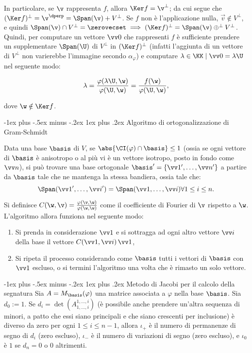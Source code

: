 \documentclass[10pt,landscape]{article}
\makeatletter
\renewcommand{\subsubsection}{\@startsection{subsubsection}{3}{0mm}%
	{-1ex plus -.5ex minus -.2ex}%
	{1ex plus .2ex}%
	{\normalfont\small\bfseries}}
\makeatother
\begin{document}
\begin{multicols}{3}
		In particolare, se $\v$ rappresenta $f$, allora $\Ker f = \v^\perp$; da cui
		segue che $(\Ker f)^\perp = \v^\dperp = \Span(\v) + V^\perp$. Se $f$ non è
		l'applicazione nulla, $\vec v \notin V^\perp$, e quindi $\Span(\v) \cap V^\perp = \zerovecset \implies (\Ker f)^\perp = \Span(\v) \oplus^\perp V^\perp$. Quindi,
		per computare un vettore $\vv 0$ che rappresenti $f$ è sufficiente prendere
		un supplementare $\Span(\U)$ di $V^\perp$ in $(\Ker f)^\perp$ (infatti l'aggiunta
		di un vettore di $V^\perp$ non varierebbe l'immagine secondo $\alpha_\varphi$) e
		computare $\lambda \in \KK \mid \vv 0 = \lambda \U$ nel seguente
		modo:
		
		\[ \lambda = \frac{\varphi(\lambda \U, \w)}{\varphi(\U, \w)} = \frac{f(\w)}{\varphi(\U, \w)}, \]
		
		dove $\w \notin \Ker f$.
		
		\subsubsection{Algoritmo di ortogonalizzazione di Gram-Schmidt}
		
		Data una base $\basis$ di $V$, se $\abs{\CI(\varphi) \cap \basis} \leq 1$ (ossia se ogni vettore di
		$\basis$ è anisotropo o al più vi è un vettore isotropo, posto in fondo come $\vv n$), si può
		trovare una base ortogonale $\basis' = \{ \vv 1', \ldots, \vv n' \}$ a partire da $\basis$ tale che ne mantenga la stessa bandiera, ossia tale che:
		\[ \Span(\vv 1', \ldots, \vv i') = \Span(\vv 1, \ldots, \vv i) \forall 1 \leq i \leq n. \]
		
		Si definisce $C(\w, \v) = \frac{\varphi(\v, \w)}{\varphi(\w, \w)}$ come il coefficiente di Fourier
		di $\v$ rispetto a $\w$. L'algoritmo allora funziona nel seguente modo:
		
		\begin{enumerate}
			\item Si prenda in considerazione $\vv 1$ e si sottragga ad ogni altro vettore $\vv i$ della base il
			vettore $C(\vv 1, \vv i) \, \vv 1$,
			\item Si ripeta il processo considerando come $\basis$ tutti i vettori di $\basis$ con $\vv 1$ escluso,
			o si termini l'algoritmo una volta che è rimasto un solo vettore.
		\end{enumerate}

		\subsubsection{Metodo di Jacobi per il calcolo della segnatura}
		Sia $A = M_\basis(\varphi)$ una matrice associata a $\varphi$ nella base $\basis$.
		Sia $d_0 := 1$. Se $d_i = \det(A_{1, \ldots, i}^{1, \ldots, i})$ (è possibile anche
		prendere un'altra sequenza di minori, a patto che essi siano principali e che siano
		crescenti per inclusione) è diverso da zero
		per ogni $1 \leq i \leq n-1$, allora $\iota_+$ è il numero di permanenze di segno
		di $d_i$ (zero escluso), $\iota_-$ è il numero di variazioni di segno (zero escluso), e $\iota_0$ è $1$ se
		$d_n = 0$ o $0$ altrimenti.
		

\end{multicols}
\end{document}
